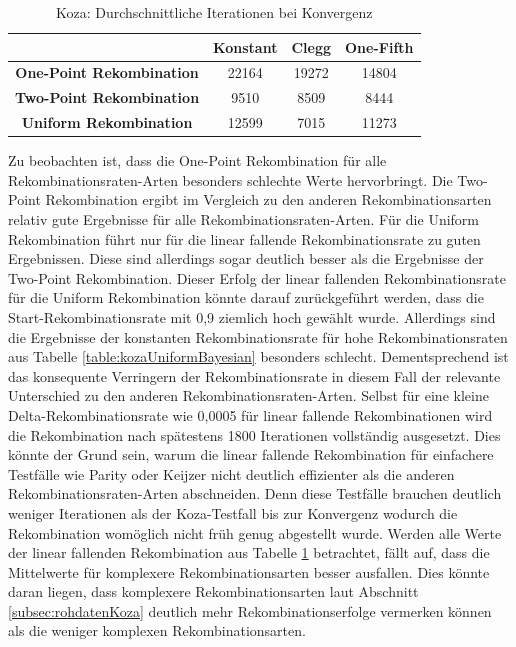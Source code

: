 \begin{table}[H]
	\centering
	\begin{tabular} {c | c | c | c}
		& \textbf{Konstant} & \textbf{Clegg} & \textbf{One-Fifth} \\
		\hline
		\textbf{One-Point Rekombination} & 22164 & 19272 & 14804\\
		\hline
		\textbf{Two-Point Rekombination} & 9510 & 8509 & 8444 \\
		\hline
		\textbf{Uniform Rekombination} & 12599 & 7015 & 11273 \\
	\end{tabular}
	\caption{Koza: Durchschnittliche Iterationen bei Konvergenz}
	\label{table:kozaMW}
\end{table}

Zu beobachten ist, dass die One-Point Rekombination für alle Rekombinationsraten-Arten besonders schlechte Werte hervorbringt.
Die Two-Point Rekombination ergibt im Vergleich zu den anderen Rekombinationsarten relativ gute Ergebnisse für alle Re\-kom\-bi\-na\-tions\-raten-Arten.
Für die Uniform Rekombination führt nur für die linear fallende Rekombinationsrate zu guten Ergebnissen.
Diese sind allerdings sogar deutlich besser als die Ergebnisse der Two-Point Rekombination.
Dieser Erfolg der linear fallenden Rekombinationsrate für die Uniform Rekombination könnte darauf zurückgeführt werden, dass die Start-Rekombinationsrate mit 0,9 ziemlich hoch gewählt wurde.
Allerdings sind die Ergebnisse der konstanten Rekombinationsrate für hohe Rekombinationsraten aus Tabelle \ref{table:kozaUniformBayesian} besonders schlecht.
Dementsprechend ist das konsequente Verringern der Rekombinationsrate in diesem Fall der relevante Unterschied zu den anderen Rekombinationsraten-Arten.
Selbst für eine kleine Delta-Rekombinationsrate wie 0,0005 für linear fallende Rekombinationen wird die Rekombination nach spätestens 1800 Iterationen vollständig ausgesetzt.
Dies könnte der Grund sein, warum die linear fallende Rekombination für einfachere Testfälle wie Parity oder Keijzer nicht deutlich effizienter als die anderen Re\-kom\-bi\-na\-tions\-raten-Arten abschneiden.
Denn diese Testfälle brauchen deutlich weniger Iterationen als der Koza-Testfall bis zur Konvergenz wodurch die Rekombination womöglich nicht früh genug abgestellt wurde.
Werden alle Werte der linear fallenden Rekombination aus Tabelle \ref{table:kozaMW} betrachtet, fällt auf, dass die Mittelwerte für komplexere Rekombinationsarten besser ausfallen.
Dies könnte daran liegen, dass komplexere Rekombinationsarten laut Abschnitt \ref{subsec:rohdatenKoza} deutlich mehr Rekombinationserfolge vermerken können als die weniger komplexen Rekombinationsarten.

